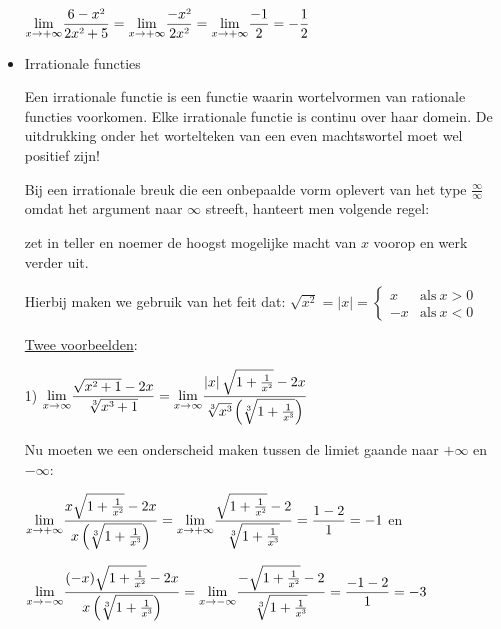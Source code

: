\begin{itemize}
${\displaystyle \lim_{x\to+\infty}}{\displaystyle \frac{6-x\text{\texttwosuperior}}{2x\text{\texttwosuperior}+5}}={\displaystyle \lim_{x\to+\infty}}{\displaystyle \frac{-x\text{\texttwosuperior}}{2x\text{\texttwosuperior}}}={\displaystyle \lim_{x\to+\infty}}{\displaystyle \frac{-1}{2}}={\displaystyle -\frac{1}{2}}$

\medskip{}



\item{Irrationale functies}

Een irrationale functie is een functie waarin wortelvormen van rationale
functies voorkomen. Elke irrationale functie is continu over haar
domein. De uitdrukking onder het wortelteken van een even machtswortel
moet wel positief zijn!

\noindent Bij een irrationale breuk die een onbepaalde vorm oplevert
van het type $\frac{\infty}{\infty}$ omdat het argument naar $\infty$
streeft, hanteert men volgende regel:

zet in teller en noemer de hoogst mogelijke macht van $x$ voorop
en werk verder uit.

\noindent Hierbij maken we gebruik van het feit dat: $\sqrt{x^{2}}=\left|x\right|=\begin{cases}
x & \mathrm{als}\:x>0\\
-x & \mathrm{als}\:x<0
\end{cases}$\medskip{}


\noindent \uline{Twee voorbeelden}:\medskip{}


1) ${\displaystyle {\displaystyle \lim_{x\to\infty}}\frac{\sqrt{x\text{\texttwosuperior}+1}-2x}{\sqrt[3]{x\text{\textthreesuperior}+1}}={\displaystyle \lim_{x\to\infty}}\frac{\left|x\right|\sqrt{1+\frac{1}{x\text{\texttwosuperior}}}-2x}{\sqrt[3]{x\text{\textthreesuperior}}\left(\sqrt[3]{1+\frac{1}{x\text{\textthreesuperior}}}\right)}}$

Nu moeten we een onderscheid maken tussen de limiet gaande naar $+\infty$
en $-\infty$:

	${\displaystyle {\displaystyle \lim_{x\to+\infty}}\frac{x\sqrt{1+\frac{1}{x\text{\texttwosuperior}}}-2x}{x\left(\sqrt[3]{1+\frac{1}{x\text{\textthreesuperior}}}\right)}={\displaystyle \lim_{x\to+\infty}}\frac{\sqrt{1+\frac{1}{x\text{\texttwosuperior}}}-2}{\sqrt[3]{1+\frac{1}{x\text{\textthreesuperior}}}}=\frac{1-2}{1}=-1}$
	en
	
${\displaystyle {\displaystyle \lim_{x\to-\infty}}\frac{(-x)\sqrt{1+\frac{1}{x\text{\texttwosuperior}}}-2x}{x\left(\sqrt[3]{1+\frac{1}{x\text{\textthreesuperior}}}\right)}={\displaystyle \lim_{x\to-\infty}}\frac{-\sqrt{1+\frac{1}{x\text{\texttwosuperior}}}-2}{\sqrt[3]{1+\frac{1}{x\text{\textthreesuperior}}}}=\frac{-1-2}{1}=-3}$ 
\medskip{}



\end{itemize}
